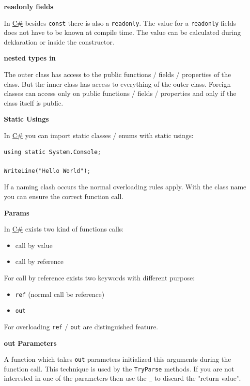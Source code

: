 \documentclass[11pt,twoside,landscape]{article}
\begin{document}
\begin{multicols}{3}
\textbf{readonly fields}

In \href{../../../roam/20211003114158-c.org}{C\#} besides \texttt{const} there is also a \texttt{readonly}.
The value for a \texttt{readonly} fields does not have to be known at compile time.
The value can be calculated during deklaration or inside the constructor.

\textbf{nested types in}

The outer class has access to the public functions / fields / properties of the class.
But the inner class has access to everything of the outer class.
Foreign classes can access only on public functions / fields / properties and only if the class itself is public.

\textbf{Static Usings}

In \href{../../../roam/20211003114158-c.org}{C\#} you can import static classes / enums with static usings:
\lstset{language=csharp,label= ,caption= ,captionpos=b,numbers=none}
\begin{lstlisting}
using static System.Console;

WriteLine("Hello World");
\end{lstlisting}

If a naming clash occurs the normal overloading rules apply.
With the class name you can ensure the correct function call.

\textbf{Params}

In \href{../../../roam/20211003114158-c.org}{C\#} exists two kind of functions calls:
\begin{itemize}
\item call by value
\item call by reference
\end{itemize}


For call by reference exists two keywords with different purpose:
\begin{itemize}
\item \texttt{ref} (normal call be reference)
\item \texttt{out}
\end{itemize}


For overloading \texttt{ref} / \texttt{out} are distinguished feature.

\textbf{out Parameters}

A function which takes \texttt{out} parameters initialized this arguments during the function call.
This technique is used by the \texttt{TryParse} methods.
If you are not interested in one of the parameters then use the \texttt{\_} to discard the "return value".


\end{multicols}
\end{document}
